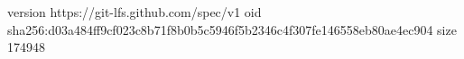 version https://git-lfs.github.com/spec/v1
oid sha256:d03a484ff9cf023c8b71f8b0b5c5946f5b2346c4f307fe146558eb80ae4ec904
size 174948
